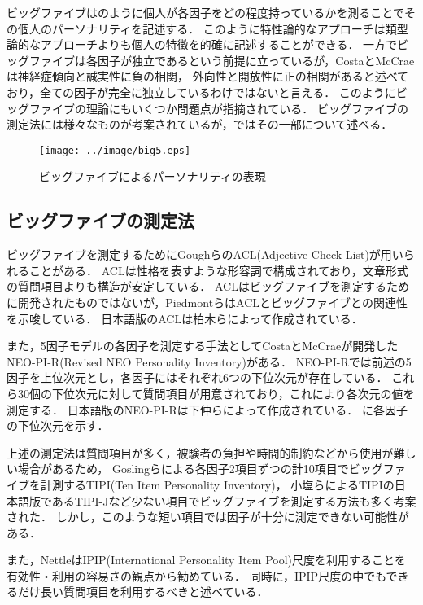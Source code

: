 ビッグファイブはのように個人が各因子をどの程度持っているかを測ることでその個人のパーソナリティを記述する．
このように特性論的なアプローチは類型論的なアプローチよりも個人の特徴を的確に記述することができる．
一方でビッグファイブは各因子が独立であるという前提に立っているが，CostaとMcCrae\cite{neo-pi-r}は神経症傾向と誠実性に負の相関，
外向性と開放性に正の相関があると述べており，全ての因子が完全に独立しているわけではないと言える\cite{eysenck-handbook}．
このようにビッグファイブの理論にもいくつか問題点が指摘されている．
ビッグファイブの測定法には様々なものが考案されているが，ではその一部について述べる．

\begin{figure}[tb]
    \centering
    \texttt{[image: ../image/big5.eps]}
    \caption{ビッグファイブによるパーソナリティの表現}
    \label{fig:big5}
\end{figure}

\subsection{ビッグファイブの測定法}
\label{sec:mesure}
ビッグファイブを測定するためにGoughら\cite{acl}のACL(Adjective Check List)が用いられることがある．
ACLは性格を表すような形容詞で構成されており，文章形式の質問項目よりも構造が安定している．
ACLはビッグファイブを測定するために開発されたものではないが，Piedmontら\cite{big5-acl}はACLとビッグファイブとの関連性を示唆している．
日本語版のACLは柏木ら\cite{acl-ja}によって作成されている．

また，5因子モデルの各因子を測定する手法としてCostaとMcCrae\cite{neo-pi-r}が開発したNEO-PI-R(Revised NEO Personality Inventory)がある．
NEO-PI-Rでは前述の5因子を上位次元とし，各因子にはそれぞれ6つの下位次元が存在している．
これら30個の下位次元に対して質問項目が用意されており，これにより各次元の値を測定する．
日本語版のNEO-PI-Rは下仲ら\cite{neo-pi-r-ja}によって作成されている．
に各因子の下位次元を示す．

上述の測定法は質問項目が多く，被験者の負担や時間的制約などから使用が難しい場合があるため，
Goslingら\cite{tipi}による各因子2項目ずつの計10項目でビッグファイブを計測するTIPI(Ten Item Personality Inventory)，
小塩ら\cite{tipi-j}によるTIPIの日本語版であるTIPI-Jなど少ない項目でビッグファイブを測定する方法も多く考案された．
しかし，このような短い項目では因子が十分に測定できない可能性がある．

また，Nettle\cite{daniel}はIPIP(International Personality Item Pool)尺度を利用することを有効性・利用の容易さの観点から勧めている．
同時に，IPIP尺度の中でもできるだけ長い質問項目を利用するべきと述べている．

